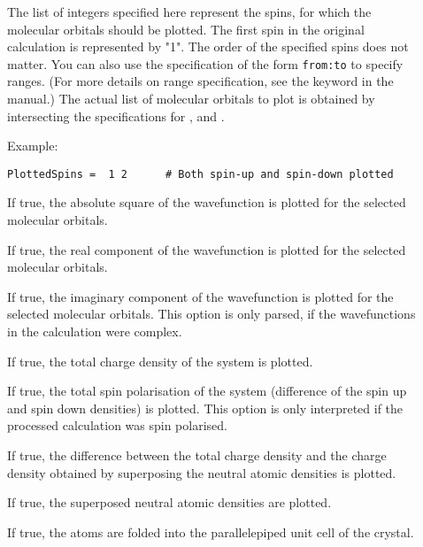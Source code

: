 \begin{description}
\item[] The list of integers specified here represent
  the spins, for which the molecular orbitals should be plotted. The
  first spin in the original \dftbp{} calculation is represented by
  "1". The order of the specified spins does not matter. You can also
  use the specification of the form \verb|from:to| to specify
  ranges. (For more details on range specification, see the
   keyword in the \dftbp{} manual.)  The actual list of
  molecular orbitals to plot is obtained by intersecting the
  specifications for ,  and
  .

Example:
\begin{verbatim}
PlottedSpins =  1 2      # Both spin-up and spin-down plotted
\end{verbatim}

\item[] If true, the absolute square of the
  wavefunction is plotted for the selected molecular orbitals.

\item[] If true, the real component of the
  wavefunction is plotted for the selected molecular orbitals.
  
\item[] If true, the imaginary component of the
  wavefunction is plotted for the selected molecular orbitals. This
  option is only parsed, if the wavefunctions in the \dftbp{}
  calculation were complex.

\item[] If true, the total charge density of
  the system is plotted.

\item[] If true, the total spin polarisation of
  the system (difference of the spin up and spin down densities) is
  plotted. This option is only interpreted if the processed \dftbp{}
  calculation was spin polarised.

\item[] If true, the difference between the
  total charge density and the charge density obtained by superposing
  the neutral atomic densities is plotted.

\item[] If true, the superposed neutral atomic
  densities are plotted.

\item[] If true, the atoms are folded into the
  parallelepiped unit cell of the crystal.


\end{description}
